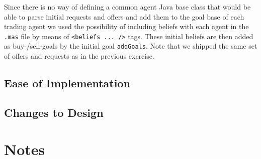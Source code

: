 \documentclass[a4paper,11pt]{article}
\begin{document}
Since there is no way of defining a common agent Java base class that would be able to parse initial requests and offers and add them to the goal base of each trading agent we used the possibility of including beliefs with each agent in the \texttt{.mas} file by means of \texttt{<beliefs ... />} tags. These initial beliefs are then added as buy-/sell-goals by the initial goal \texttt{addGoals}. Note that we shipped the same set of offers and requests as in the previous exercise.

\subsection{Ease of Implementation}

\subsection{Changes to Design}

\section{Notes}
\end{document}
